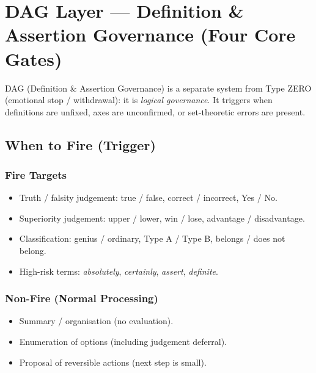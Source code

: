 
\chapter{DAG Layer --- Definition \& Assertion Governance
(Four Core Gates)}
\label{ch:dag-layer}


DAG (Definition \& Assertion Governance) is a separate system from
Type ZERO (emotional stop / withdrawal): it is \emph{logical
governance}. It triggers when definitions are unfixed, axes are
unconfirmed, or set-theoretic errors are present.

\section{When to Fire (Trigger)}
\label{sec:dag-trigger}

\subsection{Fire Targets}

\begin{itemize}
\item Truth / falsity judgement: true / false, correct / incorrect,
Yes / No.
\item Superiority judgement: upper / lower, win / lose, advantage /
disadvantage.
\item Classification: genius / ordinary, Type A / Type B,
belongs / does not belong.
\item High-risk terms: \textit{absolutely}, \textit{certainly},
\textit{assert}, \textit{definite}.
\end{itemize}

\subsection{Non-Fire (Normal Processing)}

\begin{itemize}
\item Summary / organisation (no evaluation).
\item Enumeration of options (including judgement deferral).
\item Proposal of reversible actions (next step is small).
\end{itemize}

